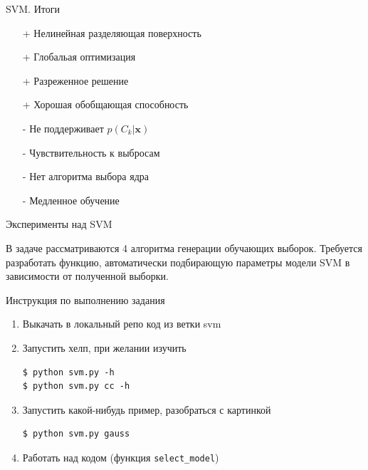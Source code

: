 \documentclass[10pt,a4paper]{beamer}
\begin{document}
\begin{frame}{SVM. Итоги}

\begin{itemize}
\item[+] Нелинейная разделяющая поверхность
\item[+] Глобальая оптимизация
\item[+] Разреженное решение
\item[+] Хорошая обобщающая способность
\item[-] Не поддерживает $p(C_k | \mathbf x)$
\item[-] Чувствительность к выбросам
\item[-] Нет алгоритма выбора ядра
\item[-] Медленное обучение
\end{itemize}

\end{frame}


\begin{frame}[fragile]{Эксперименты над SVM}

В задаче рассматриваются 4 алгоритма генерации обучающих выборок. Требуется разработать функцию, автоматически подбирающую параметры модели SVM в зависимости от полученной выборки.

\begin{small}
\vspace{1em}
Инструкция по выполнению задания
\begin{enumerate}
\item Выкачать в локальный репо код из ветки svm
\item Запустить хелп, при желании изучить
\begin{shaded}
{\color{green} \begin{verbatim}
$ python svm.py -h
$ python svm.py cc -h
\end{verbatim}}
\end{shaded}
\item Запустить какой-нибудь пример, разобраться с картинкой
\begin{shaded}
{\color{green} \begin{verbatim}
$ python svm.py gauss
\end{verbatim}}
\end{shaded}
\item Работать над кодом (функция \texttt{select\_model})
\end{enumerate}
\end{small}

\end{frame}
\end{document}
